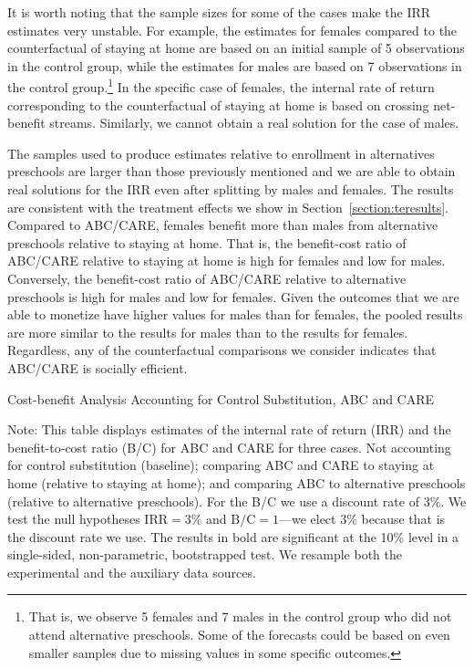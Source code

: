 It is worth noting that the sample sizes for some of the cases make the IRR estimates very unstable. For example, the estimates for females compared to the counterfactual of staying at home are based on an initial sample of 5 observations in the control group, while the estimates for males are based on 7  observations in the control group.\footnote{That is, we observe 5 females and 7 males in the control group who did not attend alternative preschools. Some of the forecasts could be based on even smaller samples due to missing values in some specific outcomes.} In the specific case of females, the internal rate of return corresponding to the counterfactual of staying at home is based on crossing net-benefit streams. Similarly, we cannot obtain a real solution for the case of males.

The samples used to produce estimates relative to enrollment in alternatives preschools are larger than those previously mentioned and we are able to obtain real solutions for the IRR even after splitting by males and females. The results are consistent with the treatment effects we show in Section~\ref{section:teresults}. Compared to ABC/CARE, females benefit more than males from alternative preschools relative to staying at home. That is, the benefit-cost ratio of ABC/CARE relative to staying at home is high for females and low for males. Conversely, the benefit-cost ratio of ABC/CARE relative to alternative preschools is high for males and low for females. Given the outcomes that we are able to monetize have higher values for males than for females, the pooled results are more similar to the results for males than to the results for females. Regardless, any of the counterfactual comparisons we consider indicates that ABC/CARE is socially efficient.

\begin{table}[H]
\begin{threeparttable}
\caption{Cost-benefit Analysis Accounting for Control Substitution, ABC and CARE}
\label{table:cbacs}
\centering

\begin{tablenotes}
\item Note: This table displays estimates of the internal rate of return (IRR) and the benefit-to-cost ratio (B/C) for ABC and CARE for three cases. Not accounting for control substitution (baseline); comparing ABC and CARE to staying at home (relative to staying at home); and comparing ABC to alternative preschools (relative to alternative preschools). For the B/C we use a discount rate of $3\%$. We test the null hypotheses $\text{IRR} = 3\%$ and $\text{B/C} = 1$---we elect $3\%$ because that is the discount rate we use. The results in bold are significant at the 10\% level in a single-sided, non-parametric, bootstrapped test. We resample both the experimental and the auxiliary data sources.
\end{tablenotes}
\end{threeparttable}
\end{table}

